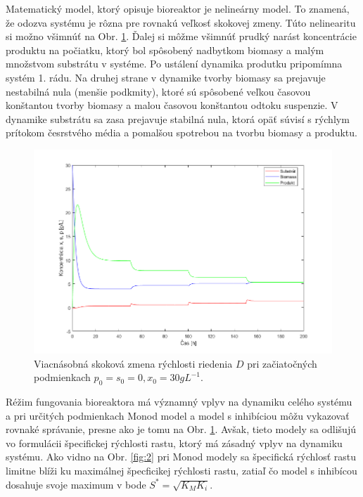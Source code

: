 Matematický model, ktorý opisuje bioreaktor je nelineárny model. To znamená, že odozva systému je rôzna pre rovnakú veľkosť skokovej zmeny. Túto nelinearitu si možno všimnúť na Obr. \ref{fig:1}. Ďalej si môžme všimnúť prudký narást koncentrácie produktu na počiatku, ktorý bol spôsobený nadbytkom biomasy a malým množstvom substrátu v systéme. Po ustálení dynamika produtku pripomímna systém 1. rádu. Na druhej strane v dynamike tvorby biomasy sa prejavuje nestabilná nula (menšie podkmity), ktoré sú spôsobené veľkou časovou konštantou tvorby biomasy a malou časovou konštantou odtoku suspenzie. V dynamike substrátu sa zasa prejavuje stabilná nula, ktorá opäť súvisí s rýchlym prítokom česrstvého média a pomalšou spotrebou na tvorbu biomasy a produktu.

\begin{figure}[H]
	\centering
	\includegraphics[width=1\linewidth]{images/step_change}
	\caption[]{Viacnásobná skoková zmena rýchlosti riedenia $D$ pri začiatočných podmienkach $p_0 = s_0 = 0, x_0 = 30 gL^{-1}$.}
	\label{fig:1}
\end{figure}

Réžim fungovania bioreaktora má významný vplyv na dynamiku celého systému a pri určitých podmienkach Monod model a model s inhibíciou môžu vykazovať rovnaké správanie, presne ako je tomu na Obr. \ref{fig:1}. Avšak, tieto modely sa odlišujú vo formulácii špecifickej rýchlosti rastu, ktorý má zásadný vplyv na dynamiku systému. Ako vidno na Obr. \ref{fig:2} pri Monod modely sa špecifická rýchlosť rastu limitne blíži ku maximálnej špecficikej rýchlosti rastu, zatiaľ čo model s inhibícou dosahuje svoje maximum v bode $S^{*} = \sqrt{K_M K_i}$. 

